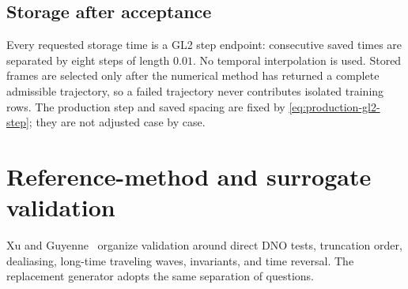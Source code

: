 \documentclass[11pt]{article}
\begin{document}
\subsection{Storage after acceptance}

Every requested storage time is a GL2 step endpoint: consecutive saved times
are separated by eight steps of length $0.01$.  No temporal interpolation is
used.  Stored frames are selected only
after the numerical method has returned a complete admissible trajectory, so
a failed trajectory never contributes isolated training rows.  The
production step and saved spacing are fixed by
\eqref{eq:production-gl2-step}; they are not adjusted case by case.

\section{Reference-method and surrogate validation}
\label{sec:validation}

Xu and Guyenne~\cite{xu2009} organize validation around direct DNO tests,
truncation order, dealiasing, long-time traveling waves, invariants, and time
reversal.  The replacement generator adopts the same separation of
questions.
\end{document}
